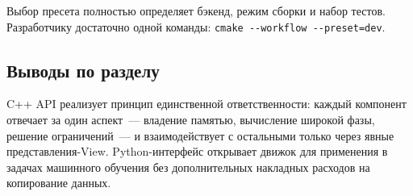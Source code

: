 Выбор пресета полностью определяет бэкенд, режим сборки и набор тестов. Разработчику достаточно одной команды: 
\texttt{cmake -{}-workflow -{}-preset=dev}.

\subsection{Выводы по разделу}

C++ API реализует принцип единственной ответственности: каждый компонент отвечает за один аспект~--- владение 
памятью, вычисление широкой фазы, решение ограничений~--- и взаимодействует с остальными только через явные 
представления-View. Python-интерфейс открывает движок для применения в задачах машинного обучения без 
дополнительных накладных расходов на копирование данных.
